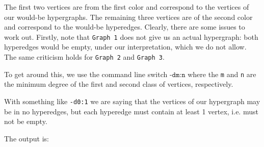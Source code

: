 The first two vertices are from the first color and correspond to the vertices of our would-be hypergraphs.
The remaining three vertices are of the second color and correspond to the would-be hyperedges.
Clearly, there are some issues to work out. Firstly, note that \texttt{Graph 1} does not give us an actual hypergraph: both hyperedges would be empty, under our interpretation, which we do not allow. The same criticism holds for \texttt{Graph 2} and \texttt{Graph 3}.

To get around this, we use the command line switch $\texttt{-dm:n}$ where the \texttt{m} and \texttt{n} are the minimum degree of the first and second class of vertices, respectively.

With something like \texttt{-d0:1} we are saying that the vertices of our hypergraph may be in no hyperedges, but each hyperedge must contain at least 1 vertex, i.e. must not be empty.


The output is:


